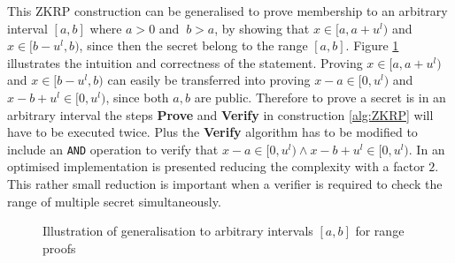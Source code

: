 This ZKRP construction can be generalised to  prove membership to an arbitrary interval $[a,b]$ where $a>0$ and  $\:b>a$, by showing  that $x\in[a,a+u^l)$ and $x\in[b-u^l,b)$, since then the secret belong to the range $[a,b]$. Figure \ref{fig:interval} illustrates the intuition and correctness of the statement.  Proving $x\in[a,a+u^l)$ and $x\in[b-u^l,b)$ can easily be transferred into proving $x-a\in[0,u^l)$ and $x-b+u^l\in[0,u^l)$, since both $a,b$ are public. Therefore to prove a secret is in an arbitrary interval the steps \textbf{Prove} and \textbf{Verify} in construction \ref{alg:ZKRP} will have to be executed twice. Plus the  \textbf{Verify} algorithm has to be modified to include an \texttt{AND} operation to verify that  $x-a\in[0,u^l) \wedge x-b+u^l\in[0,u^l)$.  In \cite{arbitary_range_opt} an optimised implementation is presented  reducing the complexity with a factor $2$. This rather small reduction is important when a verifier is required to check the range of multiple secret simultaneously.

\begin{figure}[]
    \centering
    \caption{Illustration of generalisation to arbitrary intervals $[a,b]$ for range proofs}
    \label{fig:interval}
\end{figure}


